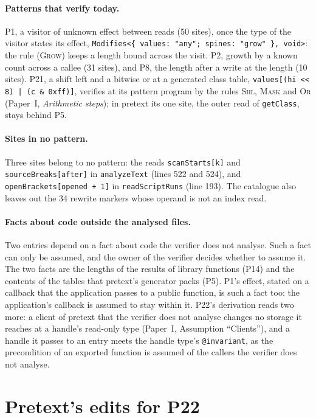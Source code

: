 \documentclass[10pt,a4paper]{article}
\theoremstyle{definition}
\theoremstyle{remark}
\newcommand{\code}[1]{\texttt{#1}}
\newcommand{\nI}[1]{Paper~I, \emph{#1}}
\begin{document}
\paragraph{Patterns that verify today.} P1, a visitor of unknown effect
between reads (50 sites), once the type of the visitor states its
effect, \code{Modifies<\{ values: "any"; spines: "grow" \}, void>}: the
rule \textsc{(Grow)} keeps a length bound across the visit. P2, growth by
a known count across a callee (31 sites), and P8, the length after a
write at the length (10 sites). P21, a shift left and a bitwise or at a
generated class table, \code{values[(hi <{}< 8) | (c \& 0xff)]}, verifies
at its pattern program by the rules \textsc{Shl}, \textsc{Mask} and
\textsc{Or} (\nI{Arithmetic steps}); in pretext its one site,
the outer read of \code{getClass}, stays behind P5.

\paragraph{Sites in no pattern.} Three sites belong to no pattern: the
reads \code{scanStarts[k]} and \code{sourceBreaks[after]} in
\code{analyzeText} (lines 522 and 524), and
\code{openBrackets[opened + 1]} in \code{readScriptRuns} (line 193).
The catalogue also leaves out the 34 rewrite markers whose operand is
not an index read.

\paragraph{Facts about code outside the analysed files.} Two entries
depend on a fact about code the verifier does not analyse. Such a fact
can only be assumed, and the owner of the verifier decides whether to
assume it. The two facts are the lengths of the results of library
functions (P14) and the contents of the tables that pretext's generator
packs (P5). P1's effect, stated on a callback that the application
passes to a public function, is such a fact too: the application's
callback is assumed to stay within it. P22's derivation reads two more:
a client of pretext that the verifier does not analyse changes no storage
it reaches at a handle's read-only type (Paper~I, Assumption ``Clients''),
and a handle it passes to an entry meets the handle type's
\code{@invariant}, as the precondition of an exported function is assumed
of the callers the verifier does not analyse.

\appendix
\section{Pretext's edits for P22}\label{app:pretext}
\end{document}
